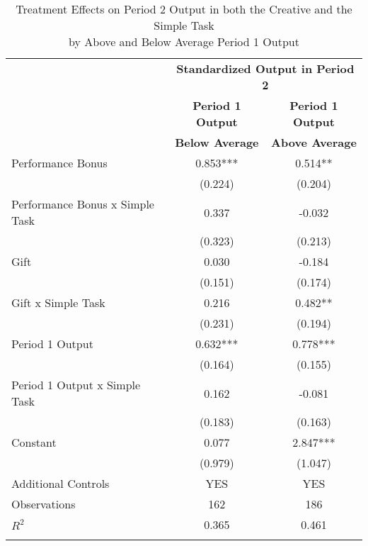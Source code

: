 \begin{table}[h]%
\captionsetup{justification=centering}
\setlength\tabcolsep{2pt}
\begin{center}%
\caption{Treatment Effects on Period 2 Output in both the Creative and the Simple Task \\ by Above and Below Average Period 1 Output}
\label{tab:BaselineReg}
{\small\renewcommand{\arraystretch}{1}%
\begin{tabular}{lcc}
\hline\noalign{\smallskip}
 & \multicolumn{2}{c}{\bf Standardized Output in Period 2} \\
\cmidrule{2-3} 
 & \bf Period 1 Output & \bf Period 1 Output \\
 & \bf Below Average & \bf Above Average \\
\hline\noalign{\smallskip}
Performance Bonus   &       0.853***&       0.514** \\
                    &     (0.224)   &     (0.204)   \\[2mm]
Performance Bonus x Simple Task&       0.337   &      -0.032   \\
                    &     (0.323)   &     (0.213)   \\[2mm]
Gift                &       0.030   &      -0.184   \\
                    &     (0.151)   &     (0.174)   \\[2mm]
Gift x Simple Task  &       0.216   &       0.482** \\
                    &     (0.231)   &     (0.194)   \\[2mm]
Period 1 Output     &       0.632***&       0.778***\\
                    &     (0.164)   &     (0.155)   \\[2mm]
Period 1 Output x Simple Task&       0.162   &      -0.081   \\
                    &     (0.183)   &     (0.163)   \\[2mm]
Constant            &       0.077   &       2.847***\\
                    &     (0.979)   &     (1.047)   \\[2mm]
\hline
\noalign{\smallskip}
Additional Controls & YES & YES  \\
\hline
\noalign{\smallskip}
Observations        &         162   &         186   \\
$R^2$               &       0.365   &       0.461   \\
\hline\noalign{\medskip}
\end{tabular}}

\end{center}
\end{table}
